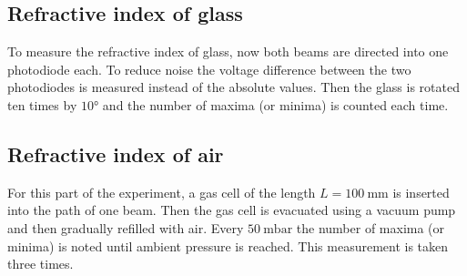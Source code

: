 \subsection{Refractive index of glass}
To measure the refractive index of glass, now both beams are directed into one photodiode each. To reduce noise the voltage difference 
between the two photodiodes is measured instead of the absolute values. Then the glass is rotated ten times by $10°$ and the number of 
maxima (or minima) is counted each time.

\subsection{Refractive index of air}
For this part of the experiment, a gas cell of the length $L = \SI{100}{\milli\meter}$ is inserted into the path of one beam. Then the 
gas cell is evacuated using a vacuum pump and then gradually refilled with air. Every $\SI{50}{\milli\bar}$ the number of maxima (or minima)
is noted until ambient pressure is reached. This measurement is taken three times. 

